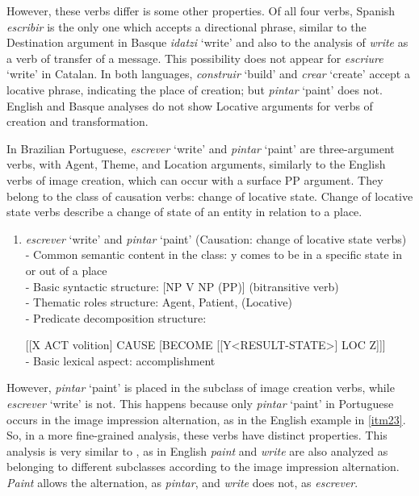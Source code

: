 \documentclass[english]{textolivre}
\begin{document}
However, these verbs differ is some other properties. Of all four verbs, Spanish \textit{escribir} is the only one which accepts a directional phrase, similar to the Destination argument in Basque \textit{idatzi} ‘write’ and also to the analysis of \textit{write} as a verb of transfer of a message. This possibility does not appear for \textit{escriure} ‘write’ in Catalan. In both languages, \textit{construir} ‘build’ and \textit{crear} ‘create’ accept a locative phrase, indicating the place of creation; but \textit{pintar} ‘paint’ does not. English and Basque analyses do not show Locative arguments for verbs of creation and transformation.

In Brazilian Portuguese, \textit{escrever} ‘write’ and \textit{pintar} ‘paint’ are three-argument verbs, with Agent, Theme, and Location arguments, similarly to the English verbs of image creation, which can occur with a surface PP argument. They belong to the class of causation verbs: change of locative state. Change of locative state verbs describe a change of state of an entity in relation to a place.

\begin{enumerate}[label=(\arabic*),resume]
\item \label{itm35} \textit{escrever} ‘write’ and \textit{pintar} ‘paint’ (Causation: change of locative state verbs) \\
- Common semantic content in the class: y comes to be in a specific state in or out of a place \\
- Basic syntactic structure: [NP V NP (PP)] (bitransitive verb) \\
- Thematic roles structure: {Agent, Patient, (Locative)} \\
- Predicate decomposition structure:

[[X ACT volition] CAUSE [BECOME [[Y<RESULT-STATE>] LOC Z]]] \\
- Basic lexical aspect: accomplishment
\end{enumerate}

However, \textit{pintar} ‘paint’ is placed in the subclass of image creation verbs, while \textit{escrever} ‘write’ is not. This happens because only \textit{pintar} ‘paint’ in Portuguese occurs in the image impression alternation, as in the English example in \ref{itm23}. So, in a more fine-grained analysis, these verbs have distinct properties. This analysis is very similar to , as in English \textit{paint} and \textit{write} are also analyzed as belonging to different subclasses according to the image impression alternation. \textit{Paint} allows the alternation, as \textit{pintar}, and \textit{write} does not, as \textit{escrever}.
\end{document}
